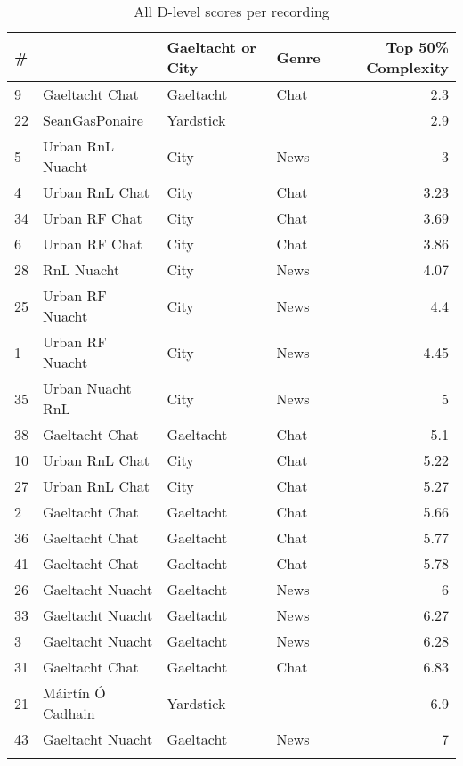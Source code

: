 \documentclass[output=paper,colorlinks,citecolor=brown]{langscibook}
\begin{document}
\begin{table}
\small
\begin{center}
\begin{tabular}{llllr}
\lsptoprule
\#  &                   & Gaeltacht or City & Genre & Top 50\% Complexity \\
\midrule
9  & Gaeltacht Chat    & Gaeltacht         & Chat  & 2.3 \\
22 & SeanGasPonaire    & Yardstick         &       & 2.9 \\
5  & Urban RnL Nuacht  & City              & News  & 3 \\
4  & Urban RnL Chat    & City              & Chat  & 3.23 \\
34 & Urban RF Chat     & City              & Chat  & 3.69 \\
6  & Urban RF Chat     & City              & Chat  & 3.86 \\
28 & RnL Nuacht        & City              & News  & 4.07 \\
25 & Urban RF Nuacht   & City              & News  & 4.4 \\
1  & Urban RF Nuacht   & City              & News  & 4.45 \\
35 & Urban Nuacht RnL  & City              & News  & 5 \\
38 & Gaeltacht Chat  & Gaeltacht         & Chat  & 5.1 \\
10 & Urban RnL Chat    & City              & Chat  & 5.22 \\
27 & Urban RnL Chat    & City              & Chat  & 5.27 \\
\midrule
2  & Gaeltacht Chat& Gaeltacht         & Chat  & 5.66 \\
36 & Gaeltacht Chat  & Gaeltacht      & Chat  & 5.77 \\
41 & Gaeltacht Chat    & Gaeltacht         & Chat  & 5.78 \\
26 & Gaeltacht Nuacht  & Gaeltacht         & News  & 6 \\
33 & Gaeltacht Nuacht  & Gaeltacht         & News  & 6.27 \\
3  & Gaeltacht Nuacht  & Gaeltacht         & News  & 6.28 \\
31 & Gaeltacht Chat  & Gaeltacht        & Chat  & 6.83 \\
21 & Máirtín Ó Cadhain & Yardstick         &       & 6.9 \\
43 & Gaeltacht Nuacht  & Gaeltacht         & News  & 7 \\
\lspbottomrule
\end{tabular}
\caption{All D-level scores per recording}
\label{tabDlevelscores}
\end{center}
\end{table}
\end{document}
